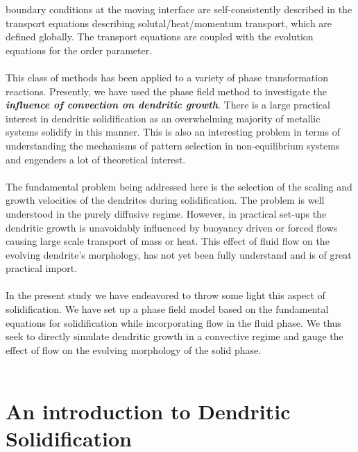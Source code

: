 \documentclass[12pt,a4paper]{report}
\begin{document}
boundary conditions at the moving interface are self-consistently described in the 
transport equations describing solutal/heat/momentum transport, which are defined globally.
The transport equations are coupled with the evolution equations for the order parameter.\\
\\
This class of methods has been applied to a variety of phase transformation reactions.
Presently, we have used the phase field method to investigate the \textbf{\textit{influence of convection on 
dendritic growth}}. There is a large practical interest in dendritic solidification as an overwhelming 
majority of metallic systems solidify in this manner. This is also an interesting problem in terms of 
understanding the mechanisms of pattern selection in non-equilibrium systems and engenders a lot of theoretical 
interest.\\
\\
The fundamental problem being addressed here is the selection of the scaling and growth 
velocities of the dendrites during solidification. The problem is well understood in the purely 
diffusive regime. However, in practical set-ups the dendritic growth is unavoidably influenced 
by buoyancy driven or forced flows causing large scale transport of mass or heat. This effect of 
fluid flow on the evolving dendrite's morphology, has not yet been fully understand and is of 
great practical import.\\ 
\\
In the present study we have endeavored to throw some light this aspect of solidification. 
We have set up a phase field model based on the fundamental equations for solidification while 
incorporating flow in the fluid phase. We thus seek to directly simulate dendritic growth in 
a convective regime and gauge the effect of flow on the evolving morphology of the solid phase.\\
\\

\chapter{An introduction to Dendritic Solidification}
\end{document}
